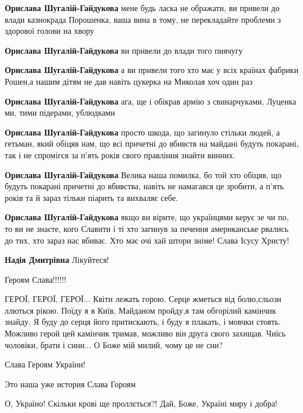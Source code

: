 \begin{itemize}
\begin{itemize}
\textbf{Орислава Шугалій-Гайдукова} мене будь ласка не ображати, ви привели до влади казнокрада Порошенка, ваша вина в тому, не перекладайте проблеми з здорової голови на хвору

\textbf{Орислава Шугалій-Гайдукова} ви привели до влади того пиячугу

\textbf{Орислава Шугалій-Гайдукова} а ви привели того хто має у всіх країнах фабрики Рошен,а нашим дітям не дав навіть цукерка на Миколая хоч один раз

\textbf{Орислава Шугалій-Гайдукова} ага, ще і обікрав армію з свинарчуками, Луценка ми, тими підерами, ублюдками

\textbf{Орислава Шугалій-Гайдукова} просто шкода, що загинуло стільки людей, а гетьман, який обіцяв нам, що всі причетні до вбивств на майдані будуть покарані, так і не спромігся за п'ять років свого правління знайти винних.

\textbf{Орислава Шугалій-Гайдукова} Велика наша помилка, бо той хто обіцяв, що будуть покарані причетні до вбивства, навіть не намагався це зробити, а п'ять років та й зараз тільки піарить та вихваляє себе.

\textbf{Орислава Шугалій-Гайдукова} якщо ви вірите, що українцями керує зе чи по, то ви не знаєте, кого Славити і ті хто загинув за печення американське рвались до тих, хто зараз нас вбиває. Хто має очі хай штори зніме!
Слава Ісусу Христу!

\textbf{Надія Дмитрівна} Лікуйтеся!
\end{itemize} %

Героям Слава!!!!!!


ГЕРОЇ, ГЕРОЇ, ГЕРОЇ... Квіти лежать горою. Серце жметься від болю,сльози
ллються рікою. Поїду я в Київ, Майданом пройду,я там обгорілий камінчик знайду.
Я буду до серця його притискають, і буду я плакать, і мовчки стоять. Можливо
герой цей камінчик тримав, можливо він друга свого захищав. Чиїсь чоловіки,
брати і сини... О Боже мій милий, чому це не сни?


Слава Героям України!

Это наша уже история Слава Гороям

О, Україно! Скільки крові ще проллється?! Дай, Боже, Україні миру і добра!


\end{itemize}
